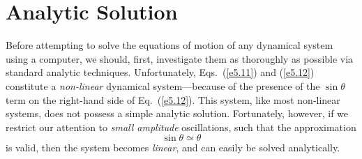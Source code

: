 \section{Analytic Solution}\label{s5.2}
Before attempting to solve the equations of motion of any dynamical system using a computer, we
should, first, investigate them as thoroughly as possible via standard analytic techniques. 
Unfortunately, Eqs.~(\ref{e5.11}) and (\ref{e5.12}) constitute a {\em non-linear} dynamical
system---because of the presence of the $\sin\theta$ term on the right-hand side of
Eq.~(\ref{e5.12}). This system, like most non-linear systems, does not possess a simple
analytic solution. Fortunately, however, if we restrict our attention to {\em small amplitude} oscillations,
such that the approximation
\begin{equation}
\sin\theta \simeq \theta
\end{equation}
is valid,
then the system becomes {\em linear}, and can easily be solved analytically.

